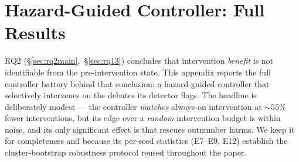 \section{Hazard-Guided Controller: Full Results}
\label{app:controller}

RQ2 (\S\ref{sec:rq2main},~\S\ref{sec:rq13}) concludes that intervention \emph{benefit} is not
identifiable from the pre-intervention state. This appendix reports the full controller battery behind
that conclusion: a hazard-guided controller that selectively intervenes on the debates its detector
flags. The headline is deliberately modest --- the controller \emph{matches} always-on intervention at
$\sim\!55\%$ fewer interventions, but its edge over a \emph{random} intervention budget is within
noise, and its only significant effect is that rescues outnumber harms. We keep it for completeness and
because its per-seed statistics (E7--E9, E12) establish the cluster-bootstrap robustness protocol
reused throughout the paper.



